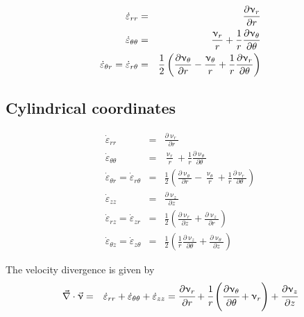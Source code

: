 \begin{eqnarray}
\dot\varepsilon_{rr} 
&=& \frac{\partial \upnu_r}{\partial r} \nonumber\\
\dot\varepsilon_{\theta\theta} 
&=& \frac{\upnu_r}{r} + \frac{1}{r} \frac{\partial \upnu_\theta}{\partial \theta}  \nonumber\\
\dot\varepsilon_{\theta r} = \dot\varepsilon_{r\theta} 
&=& \frac{1}{2} \left(   \frac{\partial \upnu_\theta}{\partial r} - \frac{\upnu_\theta}{r} 
+\frac{1}{r} \frac{\partial \upnu_r}{\partial \theta}  \right)  \nonumber
\end{eqnarray}



\subsection{Cylindrical coordinates \label{ss:srcc}}

\begin{eqnarray}
\dot\varepsilon_{rr} 
&=& \frac{\partial \upnu_r}{\partial r} 
\\
\dot\varepsilon_{\theta\theta} 
&=& \frac{\upnu_r}{r} + \frac{1}{r} \frac{\partial \upnu_\theta}{\partial \theta}  
\\
\dot\varepsilon_{\theta r} = \dot\varepsilon_{r\theta} 
&=& \frac{1}{2} \left(   \frac{\partial \upnu_\theta}{\partial r} - \frac{\upnu_\theta}{r} 
+\frac{1}{r} \frac{\partial \upnu_r}{\partial \theta}  \right)
\\
\dot\varepsilon_{zz} 
&=& \frac{\partial \upnu_z}{\partial z} 
\\
\dot{\varepsilon}_{rz} = \dot{\varepsilon}_{zr} 
&=& \frac{1}{2}\left( \frac{\partial \upnu_r}{\partial z} + \frac{\partial \upnu_z}{\partial r}  \right) 
\\
\dot{\varepsilon}_{\theta z} = \dot{\varepsilon}_{z \theta} &=& \frac{1}{2}\left( 
\frac{1}{r} \frac{\partial \upnu_z}{\partial \theta} + \frac{\partial \upnu_\theta}{\partial z}  \right) 
\end{eqnarray}


The velocity divergence is given by
\begin{eqnarray}
\vec{\nabla}\cdot\vec\upnu 
&=& \dot{\varepsilon}_{rr} + \dot{\varepsilon}_{\theta\theta} + \dot{\varepsilon}_{zz} 
 = \cfrac{\partial \upnu_r}{\partial r} + \cfrac{1}{r}\left(\cfrac{\partial \upnu_\theta}{\partial \theta} 
+ \upnu_r \right)  + \cfrac{\partial \upnu_z}{\partial z}
\end{eqnarray} 


